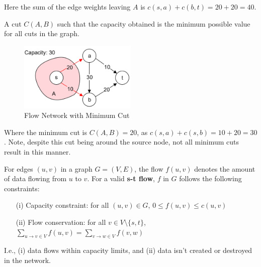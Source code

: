 \noindent
Here the sum of the edge weights leaving $A$ is $c(s,a) + c(b,t) = 20 + 20 = 40$.

\begin{Def}

    A cut $C(A,B)$ such that the capacity obtained is the minimum possible value for all cuts in the graph.
\end{Def}

\begin{figure}[h]
    \centering
    \includegraphics[width=0.5\textwidth]{Sections/net/min.png}
    \caption{Flow Network with Minimum Cut}
\end{figure}

\noindent
Where the minimum cut is $C(A,B) = 20$, as $c(s,a) + c(s,b) = 10 + 20 = 30$. Note, despite
this cut being around the source node, not all minimum cuts result in this manner.

\newpage

\begin{Def}

    For edges $(u,v)$ in a graph $G=(V,E)$, the flow $f(u,v)$ denotes the amount of data flowing from $u$ to $v$.
    For a valid \textbf{s-t flow}, $f$ in $G$ follows the following constraints:
    \begin{enumerate}
        \item [(i)] Capacity constraint: for all $(u,v)\in G$, $0 \leq f(u,v) \leq c(u,v)$ 
        \item  [(ii)] Flow conservation: for all $v \in V \setminus \{s,t\}$, ${\displaystyle \sum_{u\to v \in V} f(u,v) = \sum_{v\to w \in V} f(v,w)}$
    \end{enumerate}

    \noindent
    I.e., (i) data flows within capacity limits, and (ii) data isn't created or destroyed in the network.
\end{Def}

